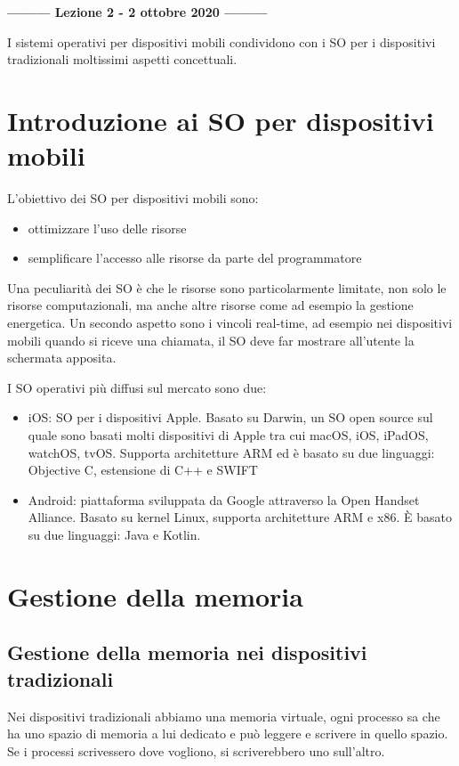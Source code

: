 \begin{center}
    \textbf{--------- Lezione 2 - 2 ottobre 2020 ---------}
\end{center}

I sistemi operativi per dispositivi mobili condividono con i SO per i dispositivi tradizionali moltissimi aspetti concettuali.

\section{Introduzione ai SO per dispositivi mobili}
L'obiettivo dei SO per dispositivi mobili sono:
\begin{itemize}
    \item ottimizzare l'uso delle risorse
    \item semplificare l'accesso alle risorse da parte del programmatore
\end{itemize}

Una peculiarità dei SO è che le risorse sono particolarmente limitate, non solo le risorse computazionali, ma anche altre risorse come ad esempio la gestione energetica. 
Un secondo aspetto sono i vincoli real-time, ad esempio nei dispositivi mobili quando si riceve una chiamata, il SO deve far mostrare all'utente la schermata apposita. 

I SO operativi più diffusi sul mercato sono due:
\begin{itemize}
    \item iOS: SO per i dispositivi Apple. Basato su Darwin, un SO open source sul quale sono basati molti dispositivi di Apple tra cui macOS, iOS, iPadOS, watchOS, tvOS. Supporta architetture ARM ed è basato su due linguaggi: Objective C, estensione di C++ e SWIFT
    \item Android: piattaforma sviluppata da Google attraverso la Open Handset Alliance. Basato su kernel Linux, supporta architetture ARM e x86. È basato su due linguaggi: Java e Kotlin. 
    
\end{itemize}

\section{Gestione della memoria}
\subsection{Gestione della memoria nei dispositivi tradizionali}
Nei dispositivi tradizionali abbiamo una memoria virtuale, ogni processo sa che ha uno spazio di memoria a lui dedicato e può leggere e scrivere in quello spazio. 
Se i processi scrivessero dove vogliono, si scriverebbero uno sull'altro. 

